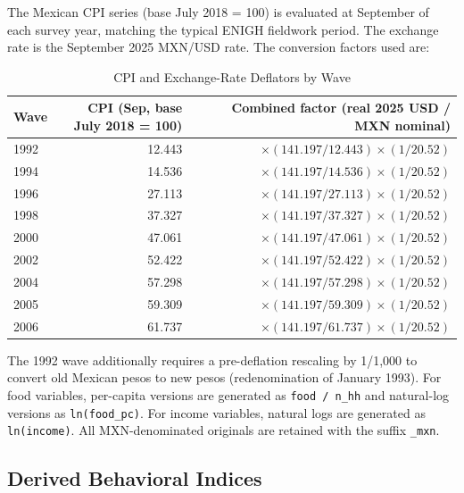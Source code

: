 The Mexican CPI series (base July 2018 = 100) is evaluated at September of
each survey year, matching the typical ENIGH fieldwork period. The exchange
rate is the September 2025 MXN/USD rate. The conversion factors used are:

\begin{table}[h!]
\centering
\caption{CPI and Exchange-Rate Deflators by Wave}
\label{tab:deflators}
\small
\begin{tabular}{lrr}
\hline\hline
Wave & CPI (Sep, base July 2018 = 100) & Combined factor (real 2025 USD / MXN nominal) \\
\hline
1992 & 12.443 & $\times (141.197/12.443) \times (1/20.52)$ \\
1994 & 14.536 & $\times (141.197/14.536) \times (1/20.52)$ \\
1996 & 27.113 & $\times (141.197/27.113) \times (1/20.52)$ \\
1998 & 37.327 & $\times (141.197/37.327) \times (1/20.52)$ \\
2000 & 47.061 & $\times (141.197/47.061) \times (1/20.52)$ \\
2002 & 52.422 & $\times (141.197/52.422) \times (1/20.52)$ \\
2004 & 57.298 & $\times (141.197/57.298) \times (1/20.52)$ \\
2005 & 59.309 & $\times (141.197/59.309) \times (1/20.52)$ \\
2006 & 61.737 & $\times (141.197/61.737) \times (1/20.52)$ \\
\hline\hline
\end{tabular}
\end{table}

\noindent
The 1992 wave additionally requires a pre-deflation rescaling by 1/1,000 to
convert old Mexican pesos to new pesos (redenomination of January 1993).
For food variables, per-capita versions are generated as \texttt{food / n\_hh}
and natural-log versions as \texttt{ln(food\_pc)}. For income variables,
natural logs are generated as \texttt{ln(income)}. All MXN-denominated
originals are retained with the suffix \texttt{\_mxn}.

\subsection{Derived Behavioral Indices}
\label{app:enigh_derived}

